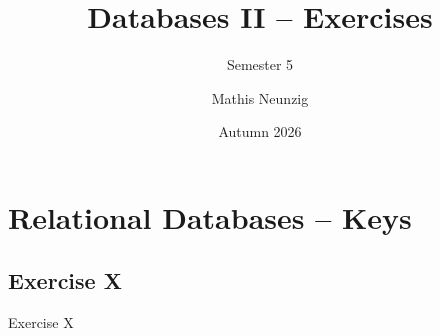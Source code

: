 \documentclass[10pt]{beamer}
\title[Databases II -- Exercises]{Databases II -- Exercises}
\subtitle{Semester 5}
\author[Neunzig, M.]{Mathis Neunzig}
\institute[DHBW Mosbach]{DHBW Mosbach}
\date[Autumn 2026]{Autumn 2026}
\begin{document}
\frame{\titlepage}

\section{Relational Databases -- Keys}

\subsection{Exercise X}

\begin{frame}{Exercise X}
\end{frame}
\end{document}
